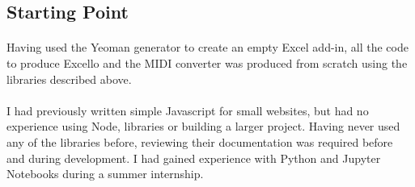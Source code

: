 %
%
\subsection{Starting Point}

\paragraph{} Having used the Yeoman generator to create an empty Excel add-in, all the code to produce Excello and the MIDI converter was produced from scratch using the libraries described above.

\paragraph{} I had previously written simple Javascript for small websites, but had no experience using Node, libraries or building a larger project. Having never used any of the libraries before, reviewing their documentation was required before and during development. I had gained experience with Python and Jupyter Notebooks during a summer internship.

